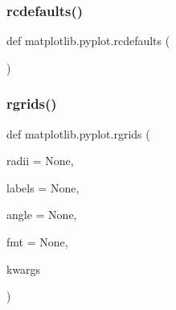 \mbox{\label{namespacematplotlib_1_1pyplot_ada85c482c5a2eacaad031407d2f060d4}} 
\subsubsection{\texorpdfstring{rcdefaults()}{rcdefaults()}}
{\footnotesize\ttfamily def matplotlib.\+pyplot.\+rcdefaults (\begin{DoxyParamCaption}{ }\end{DoxyParamCaption})}

\mbox{\label{namespacematplotlib_1_1pyplot_a62a40fc608ac431ab64962b636ba0fc4}} 
\subsubsection{\texorpdfstring{rgrids()}{rgrids()}}
{\footnotesize\ttfamily def matplotlib.\+pyplot.\+rgrids (\begin{DoxyParamCaption}\item[{}]{radii = {\ttfamily None},  }\item[{}]{labels = {\ttfamily None},  }\item[{}]{angle = {\ttfamily None},  }\item[{}]{fmt = {\ttfamily None},  }\item[{}]{kwargs }\end{DoxyParamCaption})}

